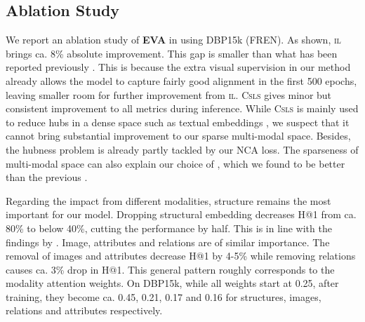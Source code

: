 \documentclass[letterpaper]{article} \usepackage{aaai21}  \usepackage{times}  \usepackage{helvet} \usepackage{courier}  \usepackage[hyphens]{url}  \usepackage{graphicx} \urlstyle{rm} \def\UrlFont{\rm}  \usepackage{natbib}  \usepackage{caption} \frenchspacing  \setlength{\pdfpagewidth}{8.5in}  \setlength{\pdfpageheight}{11in}
\newcommand{\modelname}[0]{\textbf{\textsc{EVA}}\xspace}
\begin{document}
\subsection{Ablation Study}
\label{sec:ablation_study}

We report an ablation study of \modelname in  using DBP15k (FREN).
As shown, \textsc{il} brings ca. 8\% absolute improvement.
This gap is smaller than what has been reported previously \citep{sun2018bootstrapping}. 
This is because the extra visual supervision in our method already allows the model to capture fairly good alignment in the first 500 epochs, leaving smaller room for further improvement from \textsc{il}. 
\textsc{Csls} gives minor but consistent improvement to all metrics during inference. While \textsc{Csls} is mainly used to reduce hubs in a dense space such as textual embeddings \citep{lample2018word}, we suspect that it cannot bring substantial improvement to our sparse multi-modal space. Besides, the hubness problem is already partly tackled by our NCA loss.
The sparseness of multi-modal space can also explain our choice of , which we found to be better than the previous . 


Regarding the impact from different modalities, structure remains the most important for our model. 
Dropping structural embedding decreases H@1 from ca. 80\% to below 40\%, cutting the performance by half. This is in line with the findings by \citet{yang2019aligning}. Image, attributes and relations are of similar importance. 
The removal of images and attributes decrease H@1 by 4-5\% while
removing relations causes ca. 3\% drop in H@1. This general pattern roughly corresponds to
the modality attention weights. On DBP15k, while all weights start at 0.25, after training, they become ca. 0.45, 0.21, 0.17 and 0.16 for structures, images, relations and attributes respectively.
\end{document}
